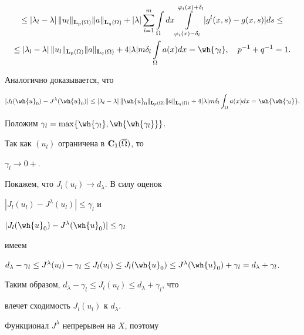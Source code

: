 \begin{pf}
\begin{multline*}
\le |\lambda_l-\lambda|\,\|u_l\|_{{\bold L}_p(\Omega)}


\|a\|_{{\bold L}_q(\Omega)}+ 


|\lambda|\sum_{i=1}^m\int\limits_{\Omega}dx


\int\limits_{\varphi_i(x)-\delta_l}^{\varphi_i(x)+\delta_l}


|g^l(x, s)-g(x, s)|ds\leq \\


%


\le |\lambda_l-\lambda|\,\|u_l\|_{{\bold L}_p(\Omega)}\|a\|_{{\bold L}_q(\Omega)}+


4|\lambda|m\delta_l\int\limits_{\Omega}a(x)dx=\wh{\gamma_l},\quad p^{-1}+q^{-1}=1.


\end{multline*}


Аналогично доказывается, что


$$


|J_l(\wh{u}_0)-J^\lambda(\wh{u}_0)|\leq |\lambda_l-\lambda|\,


\|\wh{u}_0\|_{{\bold L}_p(\Omega)}\|a\|_{{\bold L}_q(\Omega)}


+4|\lambda|m\delta_l\int_{\Omega}a(x)dx=\wh{\wh{\gamma_l}}.


$$





Положим $\gamma_l=\max\{\wh{\gamma_l}, \wh{\wh{\gamma_l}}\}$.


Так как $(u_l)$ ограничена в ${\bold C}_1(\overline{\Omega})$, то


$\gamma_l\to 0+$.





Покажем, что $J_l(u_l)\to d_\lambda$. В силу оценок


$|J_l(u_l)-J^\lambda(u_l)|\leq\gamma_l$ и


$|J_l(\wh{u}_0)-J^\lambda(\wh{u}_0)|\leq\gamma_l$


имеем


$d_\lambda-\gamma_l\leq J^\lambda(u_l)-\gamma_l\leq J_l(u_l)\leq


J_l(\wh{u}_0)\leq J^\lambda(\wh{u}_0)+\gamma_l=d_\lambda+\gamma_l$.


Таким образом, $d_\lambda-\gamma_l\leq J_l(u_l)\leq d_\lambda+\gamma_l$, что 


влечет сходимость $J_l(u_l)$ к $d_\lambda$.





Функционал $J^\lambda$ непрерывeн на $X$, поэтому



\end{pf}
